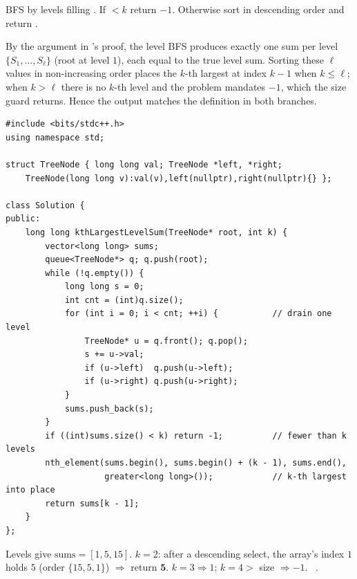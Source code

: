 BFS by levels filling . If $<k$ return $-1$. Otherwise sort
 in descending order and return .

\begin{proofbox}
By the argument in 's proof, the level BFS produces exactly one sum per
level $\{S_1,\dots,S_\ell\}$ (root at level $1$), each equal to the true level sum. Sorting
these $\ell$ values in non-increasing order places the $k$-th largest at index $k-1$ when
$k \le \ell$; when $k > \ell$ there is no $k$-th level and the problem mandates $-1$, which
the size guard returns. Hence the output matches the definition in both branches.
\end{proofbox}

\begin{lstlisting}[caption={Kth Largest Level Sum (LeetCode 2583)}, label={lst:c24-kthlevel}]
#include <bits/stdc++.h>
using namespace std;

struct TreeNode { long long val; TreeNode *left, *right;
    TreeNode(long long v):val(v),left(nullptr),right(nullptr){} };

class Solution {
public:
    long long kthLargestLevelSum(TreeNode* root, int k) {
        vector<long long> sums;
        queue<TreeNode*> q; q.push(root);
        while (!q.empty()) {
            long long s = 0;
            int cnt = (int)q.size();
            for (int i = 0; i < cnt; ++i) {           // drain one level
                TreeNode* u = q.front(); q.pop();
                s += u->val;
                if (u->left)  q.push(u->left);
                if (u->right) q.push(u->right);
            }
            sums.push_back(s);
        }
        if ((int)sums.size() < k) return -1;          // fewer than k levels
        nth_element(sums.begin(), sums.begin() + (k - 1), sums.end(),
                    greater<long long>());            // k-th largest into place
        return sums[k - 1];
    }
};
\end{lstlisting}

\begin{tracebox}
Levels give $\text{sums}=[1,5,15]$. $k=2$: after a descending select, the array's index $1$
holds $5$ (order $\{15,5,1\}$) $\Rightarrow$ return $\mathbf{5}$. $k=3\Rightarrow 1$;
$k=4 > $ size $\Rightarrow -1$. \checkmark\ .
\end{tracebox}


